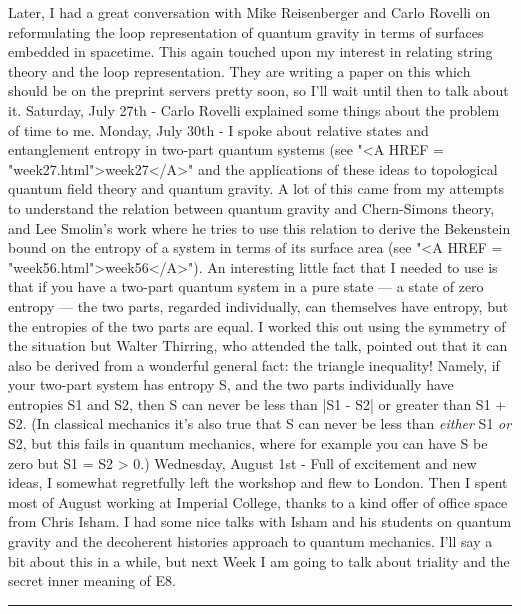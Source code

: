 Later, I had a great conversation with Mike Reisenberger and
Carlo Rovelli on reformulating the loop representation of quantum
gravity in terms of surfaces embedded in spacetime.  This again
touched upon my interest in relating string theory and the loop
representation.  They are writing a paper on this which should be
on the preprint servers pretty soon, so I'll wait until then to
talk about it.
Saturday, July 27th - Carlo Rovelli explained some things about
the problem of time to me.
Monday, July 30th - I spoke about relative states and
entanglement entropy in two-part quantum systems (see "<A HREF =
"week27.html">week27</A>" 
and the applications of these ideas to topological quantum field
theory and quantum gravity.  A lot of this came from my attempts
to understand the relation between quantum gravity and
Chern-Simons theory, and Lee Smolin's work where he tries to use
this relation to derive the Bekenstein bound on the entropy of a
system in terms of its surface area (see "<A HREF =
"week56.html">week56</A>").   
An interesting little fact that I needed to use is that if you
have a two-part quantum system in a pure state --- a state of
zero entropy --- the two parts, regarded individually, can
themselves  have entropy, but the entropies of the two parts are
equal.  I worked this out using the symmetry of the situation but
Walter Thirring, who attended the talk, pointed out that it can
also be derived from a wonderful general fact: the triangle
inequality!  Namely, if your two-part system has entropy S, and
the two parts individually have entropies S1 and S2, then S can
never be less than |S1 - S2| or greater than S1 + S2.  (In
classical mechanics it's also true that S can never be less than
\emph{either} S1 \emph{or} S2, but this fails in quantum mechanics, where
for example you can have S be zero but S1 = S2 > 0.)  
Wednesday, August 1st - Full of excitement and new ideas, I
somewhat regretfully left the workshop and flew to London.  Then
I spent most of August working at Imperial College, thanks to a
kind offer of office space from Chris Isham. I had some nice
talks with Isham and his students on quantum gravity and the
decoherent histories approach to quantum mechanics.  I'll say a
bit about this in a while, but next Week I am going to talk about
triality and the secret inner meaning of E8.
\par\noindent\rule{\textwidth}{0.4pt}


